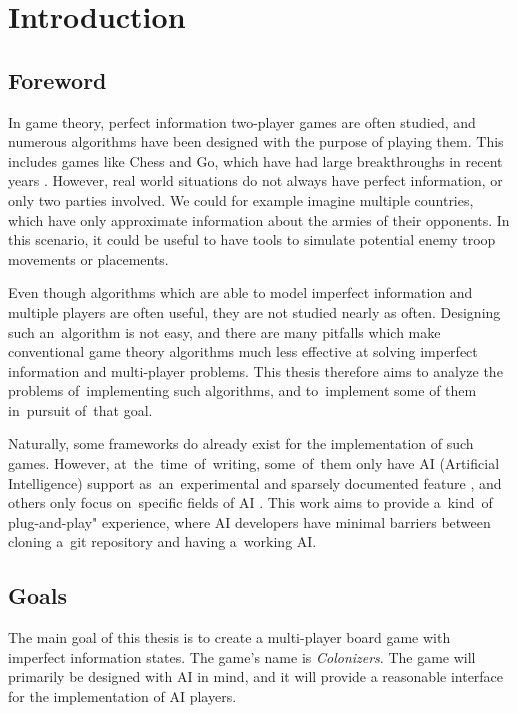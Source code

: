 \chapter*{Introduction}

\section*{Foreword}

In game theory, perfect information two-player games are often
studied, and numerous algorithms have been designed with the purpose
of playing them. This includes games like Chess and Go, which have had
large breakthroughs in recent years \cite{Silver16}. However, real world
situations do not always have perfect information, or only two parties involved.
We could for example imagine multiple countries, which have only approximate
information about the armies of their opponents. In this scenario, it could be
useful to have tools to simulate potential enemy troop movements or placements.

Even though algorithms which are able to model imperfect information and multiple
players are often useful, they are not studied nearly as often. Designing such
an~algorithm is not easy, and there are many pitfalls which make conventional
game theory algorithms much less effective at solving imperfect information and
multi-player problems. This thesis therefore aims to analyze the problems
of~implementing such algorithms, and to~implement some of them in~pursuit of~that goal.

Naturally, some frameworks do already exist for the implementation of such games.
However, at~the~time~of~writing, some~of~them only have AI (Artificial Intelligence)
support as~an~experimental and sparsely documented feature \cite{Boardgameio},
and others only focus on~specific fields of AI \cite{Openaigym}. This work aims to provide 
a~kind~of plug-and-play" experience, where AI developers have minimal barriers between
cloning a~git repository and having a~working AI.

\section*{Goals}

The main goal of this thesis is to create a multi-player board game with
imperfect information states. The game's name is \emph{Colonizers}. The game will primarily be designed with AI
in mind, and it will provide a reasonable interface for
the implementation of AI players.

